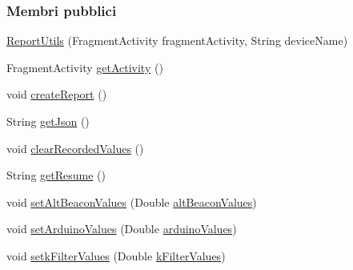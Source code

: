 \subsubsection*{Membri pubblici}
\begin{DoxyCompactItemize}
\item 
\hyperlink{classit_1_1unibo_1_1torsello_1_1bluetoothpositioning_1_1util_1_1ReportUtils_af9975aaf0a16c6a51afd258b8c3f77c0_af9975aaf0a16c6a51afd258b8c3f77c0}{Report\+Utils} (Fragment\+Activity fragment\+Activity, String device\+Name)
\item 
Fragment\+Activity \hyperlink{classit_1_1unibo_1_1torsello_1_1bluetoothpositioning_1_1util_1_1ReportUtils_a397da2904c606315301d19eb39451181_a397da2904c606315301d19eb39451181}{get\+Activity} ()
\item 
void \hyperlink{classit_1_1unibo_1_1torsello_1_1bluetoothpositioning_1_1util_1_1ReportUtils_a346661fa52c458c399de10f6ca494cd7_a346661fa52c458c399de10f6ca494cd7}{create\+Report} ()
\item 
String \hyperlink{classit_1_1unibo_1_1torsello_1_1bluetoothpositioning_1_1util_1_1ReportUtils_a768356af2517bb604a39daf2497fc761_a768356af2517bb604a39daf2497fc761}{get\+Json} ()
\item 
void \hyperlink{classit_1_1unibo_1_1torsello_1_1bluetoothpositioning_1_1util_1_1ReportUtils_aa83960dff58c2975a142c6b093abf72a_aa83960dff58c2975a142c6b093abf72a}{clear\+Recorded\+Values} ()
\item 
String \hyperlink{classit_1_1unibo_1_1torsello_1_1bluetoothpositioning_1_1util_1_1ReportUtils_a2b62843f2c0da4743686ca60edfc3aed_a2b62843f2c0da4743686ca60edfc3aed}{get\+Resume} ()
\item 
void \hyperlink{classit_1_1unibo_1_1torsello_1_1bluetoothpositioning_1_1util_1_1ReportUtils_ae68aaee9a1033dd6659cc3d6af970f60_ae68aaee9a1033dd6659cc3d6af970f60}{set\+Alt\+Beacon\+Values} (Double \hyperlink{classit_1_1unibo_1_1torsello_1_1bluetoothpositioning_1_1util_1_1ReportUtils_a6e72cc0d840390d44e6cbccece68e240_a6e72cc0d840390d44e6cbccece68e240}{alt\+Beacon\+Values})
\item 
void \hyperlink{classit_1_1unibo_1_1torsello_1_1bluetoothpositioning_1_1util_1_1ReportUtils_a3fbc76f4a952ebae654b238dbef6ca1d_a3fbc76f4a952ebae654b238dbef6ca1d}{set\+Arduino\+Values} (Double \hyperlink{classit_1_1unibo_1_1torsello_1_1bluetoothpositioning_1_1util_1_1ReportUtils_a3557dcc1662461b46fcd4d18eee9780e_a3557dcc1662461b46fcd4d18eee9780e}{arduino\+Values})
\item 
void \hyperlink{classit_1_1unibo_1_1torsello_1_1bluetoothpositioning_1_1util_1_1ReportUtils_a081697bebaa8ef8f7d245f9a7da917fa_a081697bebaa8ef8f7d245f9a7da917fa}{setk\+Filter\+Values} (Double \hyperlink{classit_1_1unibo_1_1torsello_1_1bluetoothpositioning_1_1util_1_1ReportUtils_a9a40344497c5522bbc90f03581c2713a_a9a40344497c5522bbc90f03581c2713a}{k\+Filter\+Values})

\end{DoxyCompactItemize}
